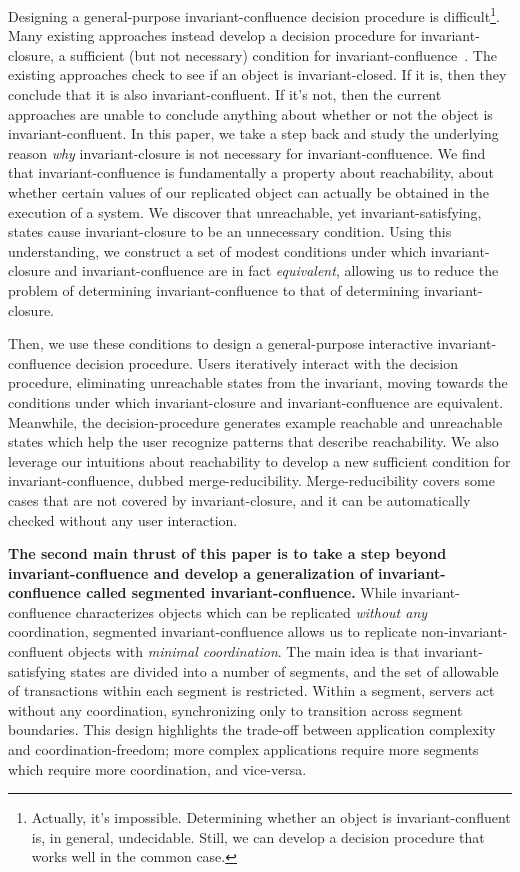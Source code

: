Designing a general-purpose invariant-confluence decision procedure is
difficult\footnote{Actually, it's impossible. Determining whether an object is
invariant-confluent is, in general, undecidable. Still, we can develop a
decision procedure that works well in the common case.}. Many existing
approaches instead develop a decision procedure for invariant-closure, a
sufficient (but not necessary) condition for
invariant-confluence~\cite{li2012making, li2014automating}. The existing
approaches check to see if an object is invariant-closed. If it is, then they
conclude that it is also invariant-confluent. If it's not, then the current
approaches are unable to conclude anything about whether or not the object is
invariant-confluent. In this paper, we take a step back and study the
underlying reason \emph{why} invariant-closure is not necessary for
invariant-confluence. We find that invariant-confluence is fundamentally a
property about reachability, about whether certain values of our replicated
object can actually be obtained in the execution of a system. We discover that
unreachable, yet invariant-satisfying, states cause invariant-closure to be an
unnecessary condition. Using this understanding, we construct a set of modest
conditions under which invariant-closure and invariant-confluence are in fact
\emph{equivalent}, allowing us to reduce the problem of determining
invariant-confluence to that of determining invariant-closure.

Then, we use these conditions to design a general-purpose interactive
invariant-confluence decision procedure. Users iteratively interact with the
decision procedure, eliminating unreachable states from the invariant, moving
towards the conditions under which invariant-closure and invariant-confluence
are equivalent. Meanwhile, the decision-procedure generates example reachable
and unreachable states which help the user recognize patterns that describe
reachability. We also leverage our intuitions about reachability to develop a
new sufficient condition for invariant-confluence, dubbed merge-reducibility.
Merge-reducibility covers some cases that are not covered by invariant-closure,
and it can be automatically checked without any user interaction.

\textbf{The second main thrust of this paper is to take a step beyond
invariant-confluence and develop a generalization of invariant-confluence
called segmented invariant-confluence.} While invariant-confluence
characterizes objects which can be replicated \emph{without any} coordination,
segmented invariant-confluence allows us to replicate non-invariant-confluent
objects with \emph{minimal coordination}. The main idea is that
invariant-satisfying states are divided into a number of segments, and the set
of allowable of transactions within each segment is restricted. Within a
segment, servers act without any coordination, synchronizing only to transition
across segment boundaries. This design highlights the trade-off between
application complexity and coordination-freedom; more complex applications
require more segments which require more coordination, and vice-versa.


